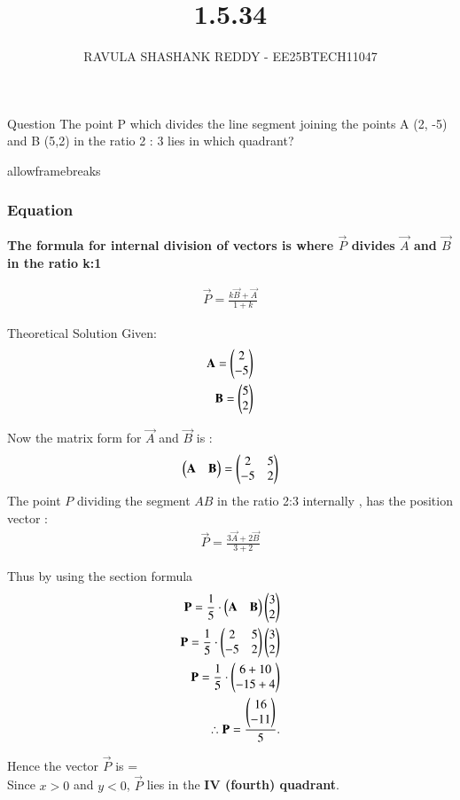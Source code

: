 \documentclass{beamer}
\title %
{1.5.34}
\author %
{RAVULA SHASHANK REDDY - EE25BTECH11047}
\begin{document}
	
	
	\frame{\titlepage}
	\begin{frame}{Question}
		The point P which divides the line segment joining the points A (2, -5)
		and B (5,2) in the ratio 2 : 3 lies in which quadrant?
	\end{frame}
	\begin{frame}{allowframebreaks}
		\frametitle{Equation}
	\textbf{The formula for internal division of vectors is where $\vec{P}$ divides $\vec{A}$ and $\vec{B}$ in the ratio k:1}
		\centering
		
		\label{tab:parameters}
		\begin{align*}
			\vec{P} =	\frac{k\vec{B} + \vec{A}}{1+k} 
		\end{align*}
		\end{frame}	
	
	\begin{frame}{Theoretical Solution}
    Given:
\begin{align}
\mathbf{A} = \begin{pmatrix}2 \\ -5\end{pmatrix} \\ \mathbf{B} = \begin{pmatrix}5 \\ 2\end{pmatrix}
\end{align}

Now the matrix form for $\vec{A}$ and $\vec{B}$ is :
\begin{align}
    \begin{pmatrix}\mathbf{A} & \mathbf{B}\end{pmatrix} = \begin{pmatrix}2 & 5 \\ -5 & 2\end{pmatrix}
\end{align}
The point \(P\) dividing the segment \(AB\) in the ratio 2:3 internally , has the position vector :
\begin{align}
\vec{P} = \frac{ 3\vec{A} +2\vec{B} }{3+2} 
\end{align}
\end{frame}
\begin{frame}
Thus by using the section formula \\
\begin{align} 
\mathbf{P}= \frac{1}{5} \cdot \begin{pmatrix}\mathbf{A} & \mathbf{B}\end{pmatrix}\begin{pmatrix}3 \\ 2\end{pmatrix}\\
\mathbf{P}= \frac{1}{5} \cdot \begin{pmatrix}2 & 5 \\ -5 & 2\end{pmatrix}\begin{pmatrix}3 \\ 2\end{pmatrix}\\
\mathbf{P}= \frac{1}{5} \cdot \begin{pmatrix}6 + 10\\ -15 + 4\end{pmatrix}\\
\therefore \mathbf{P}= \frac{\begin{pmatrix}16 \\ -11\end{pmatrix}}{5}.
\end{align}

Hence the vector $\vec{P}$ is   =  \\
Since \(x>0\) and \(y<0\), $\vec{P}$ lies in the \textbf{IV (fourth) quadrant}.

\end{frame}
	
\end{document}
